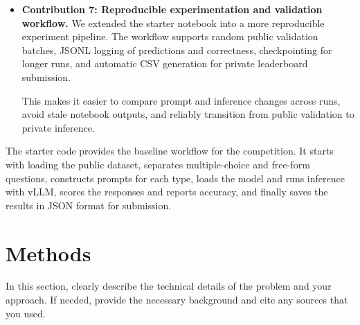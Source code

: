\documentclass{article}
\begin{document}
\begin{itemize}
Using vLLM improves GPU utilization and supports more efficient long-context generation, making large-scale inference on the full dataset more feasible.

\item \textbf{Contribution 7: Reproducible experimentation and validation workflow.}
We extended the starter notebook into a more reproducible experiment pipeline. The workflow supports random public validation batches, JSONL logging of predictions and correctness, checkpointing for longer runs, and automatic CSV generation for private leaderboard submission.

This makes it easier to compare prompt and inference changes across runs, avoid stale notebook outputs, and reliably transition from public validation to private inference.
\end{itemize}

The starter code provides the baseline workflow for the competition. It starts with loading the public dataset, separates multiple-choice and free-form questions, constructs prompts for each type, loads the model and runs inference with vLLM, scores the responses and reports accuracy, and finally saves the results in JSON format for submission.  



\section{Methods}
\label{sec:methods}
In this section, clearly describe the technical details of the problem and your approach. If needed, provide the necessary background and cite any sources that you used.
\end{document}
